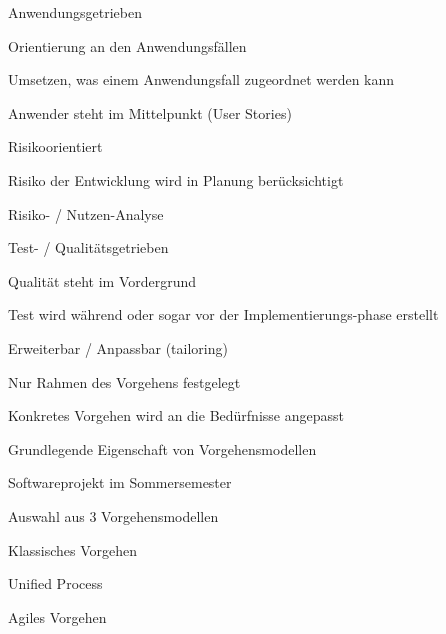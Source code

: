 \documentclass[a4paper]{article}
\begin{document}
\begin{multicols}{3}
\begin{itemize*}
\begin{itemize*}
\begin{itemize*}
      \end{itemize*}
      \item Anwendungsgetrieben
      \begin{itemize*}
        \item Orientierung an den Anwendungsfällen
        \item Umsetzen, was einem Anwendungsfall zugeordnet werden kann
        \item Anwender steht im Mittelpunkt (User Stories)
      \end{itemize*}
      \item Risikoorientiert
      \begin{itemize*}
        \item Risiko der Entwicklung wird in Planung berücksichtigt
        \item Risiko- / Nutzen-Analyse
      \end{itemize*}
      \item Test- / Qualitätsgetrieben
      \begin{itemize*}
        \item Qualität steht im Vordergrund
        \item Test wird während oder sogar vor der Implementierungs-phase erstellt
      \end{itemize*}
      \item Erweiterbar / Anpassbar (tailoring)
      \begin{itemize*}
        \item Nur Rahmen des Vorgehens festgelegt
        \item Konkretes Vorgehen wird an die Bedürfnisse angepasst
        \item Grundlegende Eigenschaft von Vorgehensmodellen
      \end{itemize*}
    \end{itemize*}
    \item Softwareprojekt im Sommersemester
    \begin{itemize*}
      \item Auswahl aus 3 Vorgehensmodellen
      \begin{itemize*}
        \item Klassisches Vorgehen
        \item Unified Process
        \item Agiles Vorgehen
      \end{itemize*}
    \end{itemize*}
  \end{itemize*}


\end{multicols}
\end{document}

